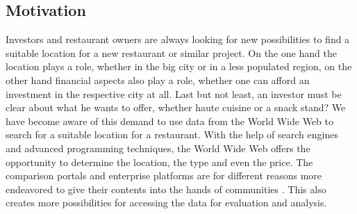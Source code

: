 \subsection{Motivation}
\label{subsec:motivation}
Investors and restaurant owners are always looking for new possibilities to find a suitable location for a new restaurant or similar project. On the one hand the location plays a role, whether in the big city or in a less populated region, on the other hand financial aspects also play a role, whether one can afford an investment in the respective city at all. Last but not least, an investor must be clear about what he wants to offer, whether haute cuisine or a snack stand? We have become aware of this demand to use data from the World Wide Web to search for a suitable location for a restaurant. With the help of search engines and advanced programming techniques, the World Wide Web offers the opportunity to determine the location, the type and even the price. The comparison portals and enterprise platforms are for different reasons more endeavored to give their contents into the hands of communities \cite{socialbusiness}.  This also creates more possibilities for accessing the data for evaluation and analysis. 

